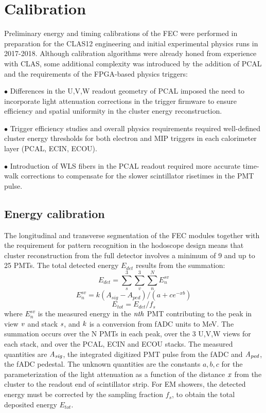 \section{Calibration} \label{Calibration}

Preliminary energy and timing calibrations of the FEC were performed in preparation for the CLAS12 engineering and initial experimental physics runs in 2017-2018.  Although calibration algorithms were already honed from experience with CLAS, some additional complexity was introduced by the addition of PCAL and the requirements of the FPGA-based physics triggers: 

$\bullet$ Differences in the U,V,W readout geometry of PCAL imposed the need to incorporate light attenuation corrections in the trigger firmware to ensure efficiency and spatial uniformity in the cluster energy reconstruction.

$\bullet$ Trigger efficiency studies and overall physics requirements required well-defined cluster energy thresholds for both electron and MIP triggers in each calorimeter layer (PCAL, ECIN, ECOU).

$\bullet$ Introduction of WLS fibers in the PCAL readout required more accurate time-walk corrections to compensate for the slower scintillator risetimes in the PMT pulse.

\subsection{Energy calibration}
The longitudinal and transverse segmentation of the FEC modules together with the requirement for pattern recognition in the hodoscope design means that cluster reconstruction from the full detector involves a minimum of 9 and up to 25 PMTs.  The total detected energy $E_{det}$ results from the summation:
\begin{equation}
 E_{det} = \sum_{s}^{3} \sum_{v}^{3} \sum_{n}^{N} E_{n}^{sv}\label{eq:E1}
\end{equation}
\begin{equation}
 E_{n}^{sv} = k(A_{sig}-A_{ped})/(a+c e^{-xb})   \label{eq:E2}
\end{equation}
\begin{equation}
 E_{tot} = E_{det}/f_{s}                 \label{eq:E3}
\end{equation}
where $E_{n}^{sv}$ is the measured energy in the $\it{nth}$ PMT contributing to the peak 
in view $\it{v}$ and stack $\it{s}$, and $\it{k}$ is a conversion from fADC units to MeV.  The summation occurs over the N PMTs in each peak, over the 3 U,V,W views for each stack, and over the PCAL, ECIN and ECOU stacks.  The measured quantities are $\it{A_{sig}}$, the integrated digitized PMT pulse from the fADC and $\it{A_{ped}}$, the fADC pedestal.  The unknown quantities are the constants $a,b,c$ for the parameterization of the light attenuation as a function of the distance $\it{x}$ from the cluster to the readout end of scintillator strip. For EM showers, the detected energy must be corrected by the sampling fraction $f_{s}$, to obtain the total deposited energy $E_{tot}$.  

